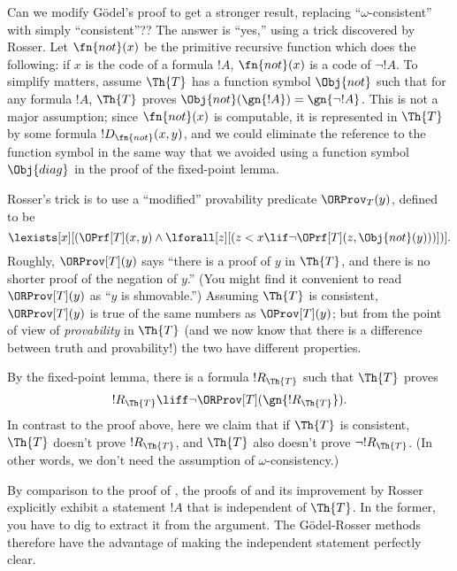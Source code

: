 \documentclass[../../include/open-logic-section]{subfiles}
\begin{document}


Can we modify G\"odel's proof to get a stronger result, replacing
``$\omega$-consistent'' with simply ``consistent''?? The answer is
``yes,'' using a trick discovered by Rosser. Let $\fn{not}(x)$ be the
primitive recursive function which does the following: if $x$ is the
code of a formula $!A$, $\fn{not}(x)$ is a code of $\lnot !A$.  To
simplify matters, assume $\Th{T}$ has a function symbol $\Obj{not}$
such that for any formula $!A$, $\Th{T}$ proves $\Obj{not}(\gn{!A}) =
\gn{\lnot !A}$. This is not a major assumption; since $\fn{not}(x)$ is
computable, it is represented in $\Th{T}$ by some formula
$!D_{\fn{not}}(x,y)$, and we could eliminate the reference to the
function symbol in the same way that we avoided using a function
symbol $\Obj{diag}$ in the proof of the fixed-point lemma.

Rosser's trick is to use a ``modified'' provability predicate
$\ORProv_T(y)$, defined to be
\[
\lexists[x][(\OPrf[T](x,y) \land \lforall[z][(z < x \lif \lnot
  \OPrf[T](z,{\Obj{not}}(y)))])].
\]
Roughly, $\ORProv[T](y)$ says ``there is a proof of $y$ in $\Th{T}$,
and there is no shorter proof of the negation of $y$.'' (You might
find it convenient to read $\ORProv[T](y)$ as ``$y$ is shmovable.'')
Assuming $\Th{T}$ is consistent, $\ORProv[T](y)$ is true of the same
numbers as $\OProv[T](y)$; but from the point of view of {\em
  provability} in $\Th{T}$ (and we now know that there is a difference
between truth and provability!) the two have different properties.

By the fixed-point lemma, there is a formula $!R_\Th{T}$ such that $\Th{T}$
proves
\[
!R_\Th{T} \liff \lnot \ORProv[T](\gn{!R_\Th{T}}).
\]
In contrast to the proof above, here we claim that if $\Th{T}$ is
consistent, $\Th{T}$ doesn't prove $!R_\Th{T}$, and $\Th{T}$ also
doesn't prove $\lnot !R_\Th{T}$. (In other words, we don't need the
assumption of $\omega$-consistency.)

\begin{digress}
By comparison to the proof of
, the proofs of
 and its improvement by Rosser
explicitly exhibit a statement $!A$ that is independent of $\Th{T}$.
In the former, you have to dig to extract it from the argument. The
G\"odel-Rosser methods therefore have the advantage of making the
independent statement perfectly clear.
\end{digress}
\end{document}
